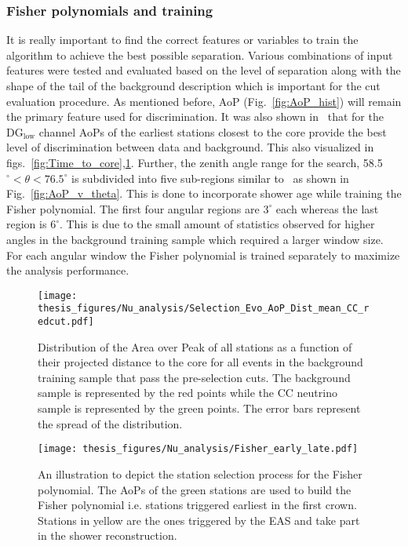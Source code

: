 \subsubsection{Fisher polynomials and training}
\label{subsubsec:nu_sel_fisher_training}
It is really important to find the correct features or variables to train the algorithm to achieve the best possible separation. Various combinations of input features were tested and evaluated based on the level of separation along with the shape of the tail of the background description which is important for the cut evaluation procedure. As mentioned before, AoP (Fig.~\ref{fig:AoP_hist}) will remain the primary feature used for discrimination. It was also shown in~\cite{gap_note_2013} that for the DG$\mathrm{_{low}}$ channel AoPs of the earliest stations closest to the core provide the best level of discrimination between data and background. This also visualized in figs.~\ref{fig:Time_to_core},\ref{fig:Dist_to_core}. Further, the zenith angle range for the search, 58.5$^\circ < \theta < 76.5^\circ$ is subdivided into five sub-regions similar to~\cite{gap_note_2013} as shown in Fig.~\ref{fig:AoP_v_theta}. This is done to incorporate shower age while training the Fisher polynomial. The first four angular regions are $3^\circ$ each whereas the last region is $6^\circ$. This is due to the small amount of statistics observed for higher angles in the background training sample which required a larger window size. For each angular window the Fisher polynomial is trained separately to maximize the analysis performance. 

\begin{figure}[t!]
  \centering
  \texttt{[image: thesis\_figures/Nu\_analysis/Selection\_Evo\_AoP\_Dist\_mean\_CC\_redcut.pdf]}
  \caption{Distribution of the Area over Peak of all stations as a function of their projected distance to the core for all events in the background training sample that pass the pre-selection cuts. The background sample is represented by the red points while the CC neutrino sample is represented by the green points. The error bars represent the spread of the distribution.}
  \label{fig:Dist_to_core}
\end{figure}

\begin{figure}[h!]
  \centering
  \texttt{[image: thesis\_figures/Nu\_analysis/Fisher\_early\_late.pdf]}
  \caption{An illustration to depict the station selection process for the Fisher polynomial. The AoPs of the green stations are used to build the Fisher polynomial i.e. stations triggered earliest in the first crown. Stations in yellow are the ones triggered by the EAS and take part in the shower reconstruction.}
  \label{fig:AoP_early_late}
\end{figure}


